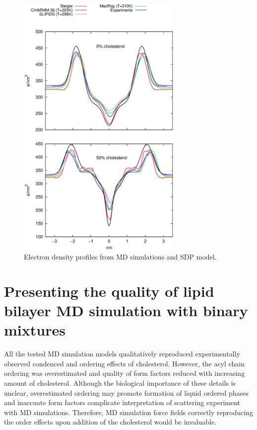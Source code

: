 \documentclass[aps,prl,superscriptaddress,twocolumn]{revtex4}
\begin{document}
\begin{figure}[]
  \centering
  \includegraphics[width=8cm]{../FIGS/densitiesEXTREMES.eps}
  \caption{\label{densities}
    Electron density profiles from MD simulations and SDP model.
  }
\end{figure}


\section{Presenting the quality of lipid bilayer MD simulation with binary mixtures}  

All the tested MD simulation models qualitatively reproduced experimentally observed condenced and
ordering effects of cholesterol. However, the acyl chain ordering was overestimated and quality
of form factors reduced with increasing amount of cholesterol. Although the biological importance
of these details is unclear, overestimated ordering may promote formation of liquid ordered phases and
inaccuate form factors complicate interpretation of scattering experiment with MD simulations.
Therefore, MD simulation force fields correctly reproducing the order effects upon addition of the
cholesterol would be invaluable.
\end{document}
